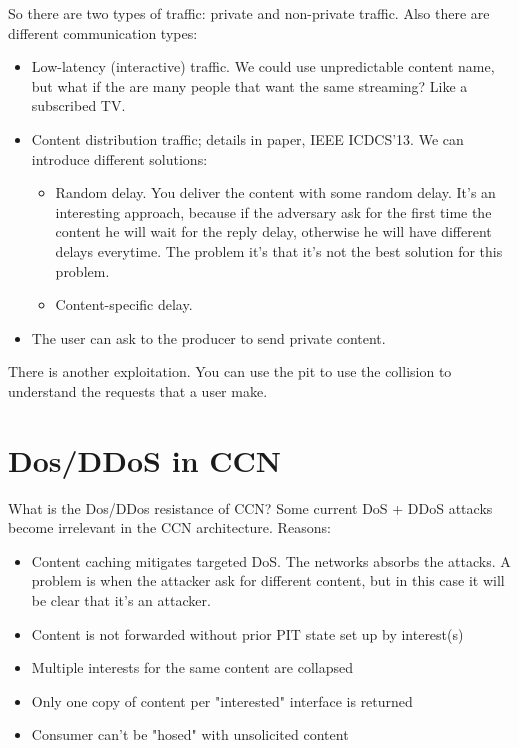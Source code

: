 So there are two types of traffic: private and non-private traffic. Also there
are different communication types:
\begin{itemize}
  \item Low-latency (interactive) traffic. We could use unpredictable content
name, but what if the are many people that want the same streaming? Like a
subscribed TV.
  \item Content distribution traffic; details in paper, IEEE ICDCS'13. We can
introduce different solutions:
  \begin{itemize}
    \item Random delay. You deliver the content with some random delay. It's an
interesting approach, because if the adversary ask for the first time the
content he will wait for the reply delay, otherwise he will have different
delays everytime. The problem it's that it's not the best solution for this
problem.
    \item Content-specific delay.
  \end{itemize}

  \item The user can ask to the producer to send private content.
\end{itemize}

There is another exploitation. You can use the pit to use the collision to
understand the requests that a user make.

\section{Dos/DDoS in CCN}

What is the Dos/DDos resistance of CCN?
Some current DoS + DDoS attacks become irrelevant in the CCN architecture.
Reasons:
\begin{itemize}
  \item Content caching mitigates targeted DoS. The networks absorbs the
attacks. A problem is when the attacker ask for different content, but in this
case it will be clear that it's an attacker.
  \item Content is not forwarded without prior PIT state set up by interest(s)
  \item Multiple interests for the same content are collapsed
  \item Only one copy of content per "interested" interface is returned
  \item Consumer can't be "hosed" with unsolicited content
\end{itemize}

